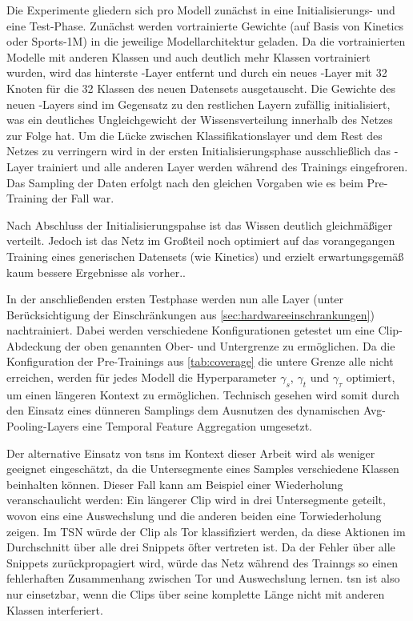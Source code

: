 Die Experimente gliedern sich pro Modell zunächst in eine Initialisierungs- und eine Test-Phase.
Zunächst werden vortrainierte Gewichte (auf Basis von Kinetics oder Sports-1M) in die jeweilige Modellarchitektur geladen.
Da die vortrainierten Modelle mit anderen Klassen und auch deutlich mehr Klassen vortrainiert wurden, wird das hinterste \fc-Layer entfernt und durch ein neues \fc-Layer mit 32 Knoten für die 32 Klassen des neuen Datensets ausgetauscht.
Die Gewichte des neuen \fc-Layers sind im Gegensatz zu den restlichen Layern zufällig initialisiert, was ein deutliches Ungleichgewicht der Wissensverteilung innerhalb des Netzes zur Folge hat.
Um die Lücke zwischen Klassifikationslayer und dem Rest des Netzes zu verringern wird in der ersten Initialisierungsphase ausschließlich das \fc-Layer trainiert und alle anderen Layer werden während des Trainings eingefroren.
Das Sampling der Daten erfolgt nach den gleichen Vorgaben wie es beim Pre-Training der Fall war.

Nach Abschluss der Initialisierungspahse ist das Wissen deutlich gleichmäßiger verteilt.
Jedoch ist das Netz im Großteil noch optimiert auf das vorangegangen Training eines generischen Datensets (wie Kinetics) und erzielt erwartungsgemäß kaum bessere Ergebnisse als vorher..

In der anschließenden ersten Testphase werden nun alle Layer (unter Berücksichtigung der Einschränkungen aus \autoref{sec:hardwareeinschrankungen}) nachtrainiert.
Dabei werden verschiedene Konfigurationen getestet um eine Clip-Abdeckung der oben genannten Ober- und Untergrenze zu ermöglichen.
Da die Konfiguration der Pre-Trainings aus \autoref{tab:coverage} die untere Grenze alle nicht erreichen, werden für jedes Modell die Hyperparameter $\gamma_s$, $\gamma_t$ und $\gamma_\tau$ optimiert, um einen längeren Kontext zu ermöglichen.
Technisch gesehen wird somit durch den Einsatz eines dünneren Samplings \bzw dem Ausnutzen des dynamischen Avg-Pooling-Layers eine Temporal Feature Aggregation umgesetzt.

Der alternative Einsatz von \glspl{tsn} im Kontext dieser Arbeit wird als weniger geeignet eingeschätzt, da die Untersegmente eines Samples verschiedene Klassen beinhalten können.
Dieser Fall kann am Beispiel einer Wiederholung veranschaulicht werden: Ein längerer Clip wird in drei Untersegmente geteilt, wovon eins eine Auswechslung und die anderen beiden eine Torwiederholung zeigen.
Im TSN würde der Clip als Tor klassifiziert werden, da diese Aktionen im Durchschnitt über alle drei Snippets öfter vertreten ist.
Da der Fehler über alle Snippets zurückpropagiert wird, würde das Netz während des Trainngs so einen fehlerhaften Zusammenhang zwischen Tor und Auswechslung lernen.
\gls{tsn} ist also nur einsetzbar, wenn die Clips über seine komplette Länge nicht mit anderen Klassen interferiert.

